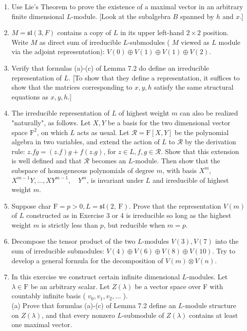 \documentclass[10pt]{article}
\begin{document}
\begin{enumerate}
  \item Use Lie's Theorem to prove the existence of a maximal vector in an arbitrary finite dimensional $L$-module. [Look at the subalgebra $B$ spanned by $h$ and $x$.]
  \item $M=\mathfrak{s l}(3, F)$ contains a copy of $L$ in its upper left-hand $2 \times 2$ position. Write $M$ as direct sum of irreducible $L$-submodules ( $M$ viewed as $L$ module via the adjoint representation): $V(0) \oplus V(1) \oplus V(1) \oplus V(2)$.
  \item Verify that formulas (a)-(c) of Lemma 7.2 do define an irreducible representation of $L$. [To show that they define a representation, it suffices to show that the matrices corresponding to $x, y, h$ satisfy the same structural equations as $x, y, h$.]
  \item The irreducible representation of $L$ of highest weight $m$ can also be realized "naturally", as follows. Let $X, Y$ be a basis for the two dimensional vector space $\mathrm{F}^{2}$, on which $L$ acts as usual. Let $\mathscr{R}=\mathrm{F}[X, Y]$ be the polynomial algebra in two variables, and extend the action of $L$ to $\mathscr{R}$ by the derivation rule: $z . f g=(z . f) g+f(z . g)$, for $z \in L, f, g \in \mathscr{R}$. Show that this extension is well defined and that $\mathscr{R}$ becomes an $L$-module. Then show that the subspace of homogeneous polynomials of degree $m$, with basis $X^{m}$, $X^{m-1} Y, \ldots, X Y^{m-1}, \quad Y^{m}$, is invariant under $L$ and irreducible of highest weight $m$.
  \item Suppose char $\mathrm{F}=p>0, L=\mathfrak{s l}(2, \mathrm{~F})$. Prove that the representation $V(m)$ of $L$ constructed as in Exercise 3 or 4 is irreducible so long as the highest weight $m$ is strictly less than $p$, but reducible when $m=p$.
  \item Decompose the tensor product of the two $L$-modules $V(3), V(7)$ into the sum of irreducible submodules: $V(4) \oplus V(6) \oplus V(8) \oplus V(10)$. Try to develop a general formula for the decomposition of $V(m) \otimes V(n)$.
  \item In this exercise we construct certain infinite dimensional $L$-modules. Let $\lambda \in \mathrm{F}$ be an arbitrary scalar. Let $Z(\lambda)$ be a vector space over F with countably infinite basis ( $v_{0}, v_{1}, v_{2}, \ldots$ ).\\
(a) Prove that formulas (a)-(c) of Lemma 7.2 define an $L$-module structure on $Z(\lambda)$, and that every nonzero $L$-submodule of $Z(\lambda)$ contains at least one maximal vector.\\

\end{enumerate}
\end{document}
